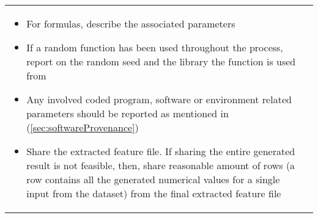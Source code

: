 \begin{table}[ht]
\begin{tabular}{| P{14cm} || p{2cm} |}
\begin{itemize}
\begin{itemize}
                           \item
                            {\footnotesize For formulas, describe the associated parameters}
                            \item
                            {\footnotesize If a random function has been used throughout the process, report on the random seed and the library 
                            the function is used from}
                            \item
                            {\footnotesize Any involved coded program, software or environment related parameters should be reported as mentioned in (\ref{sec:softwareProvenance})}
                            \item
                            {\footnotesize Share the extracted feature file. If sharing the entire generated result is not feasible, then, 
                            share reasonable amount of rows (a row contains all the generated numerical values for a single input from the dataset) 
                            from the final extracted feature file}
                    \end{itemize}
                

\end{itemize}
\end{tabular}
\end{table}
